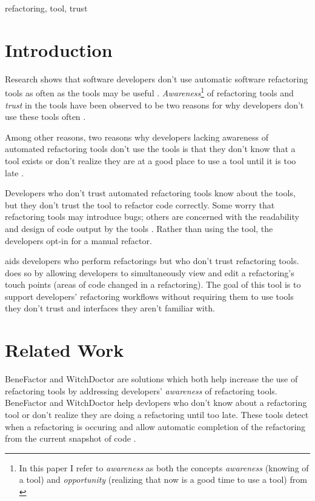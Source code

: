 \documentclass{sigplanconf}
\begin{document}
\keywords
refactoring, tool, trust

\section{Introduction}
Research shows that software developers don't use automatic software
refactoring tools as often as the tools may be useful \cite{how-refactor}.
\textit{Awareness}\footnote{In this paper I refer to \textit{awareness} as both
the concepts \textit{awareness} (knowing of a tool) and \textit{opportunity}
(realizing that now is a good
time to use a tool) from \cite{how-refactor}} of refactoring tools and
\textit{trust} in the tools have
been observed to be two reasons for why developers don't use these tools
often \cite{how-refactor, say-refactor}.

Among other reasons, two reasons why developers lacking awareness of
automated refactoring tools don't use the tools is that they don't know that a
tool exists or don't realize they
are at a good place to use a tool until it is too late \cite{how-refactor}.

Developers who don't trust automated refactoring
tools know about the tools, but they don't trust the tool to refactor code
correctly. Some worry that refactoring tools may introduce bugs; others
are concerned with the readability and design of code output by the
tools \cite{say-refactor}.
Rather than using the tool, the developers opt-in for a manual refactor.

\pname{} aids developers who perform
refactorings but who don't trust refactoring tools. \pname{} does so by allowing
developers to simultaneously view and edit a refactoring's touch points
(areas of code changed in a refactoring). The goal of this tool is to support
developers' refactoring workflows without requiring them to use tools they don't
trust and interfaces they aren't familiar with.

\section{Related Work}
BeneFactor \cite{bene-factor} and WitchDoctor \cite{witch-doctor} are solutions
which both help increase the use of refactoring tools by addressing
developers' \textit{awareness} of refactoring tools.
BeneFactor and WitchDoctor help devlopers who don't know about a
refactoring tool or don't realize they are doing a refactoring until too late.
These tools detect when a refactoring is occuring and allow automatic completion
of the refactoring from the current snapshot of code
\cite{bene-factor, witch-doctor}.
\end{document}
